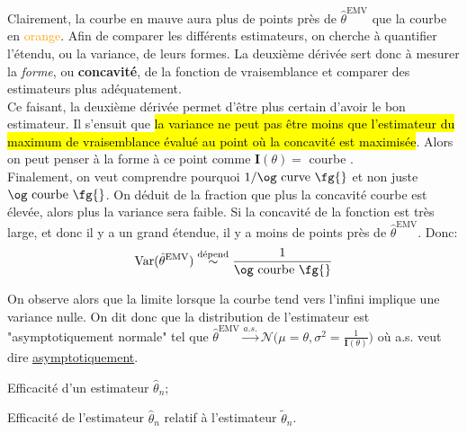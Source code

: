 \documentclass[10pt, french]{article}
\begin{document}
\begin{multicols*}{2}

Clairement, la courbe \textcolor{amethyst}{en mauve} aura plus de points près de $\hat{\theta}^{\text{EMV}}$ que la courbe en \textcolor{orange}{orange}. Afin de comparer les différents estimateurs, on cherche à quantifier l'étendu, ou la variance, de leurs formes. 
La deuxième dérivée sert donc à mesurer la \textit{forme}, ou \textbf{concavité}, de la fonction de vraisemblance et comparer des estimateurs plus adéquatement. \\

Ce faisant, la deuxième dérivée permet d'être plus certain d'avoir le bon estimateur. Il s'ensuit que \hl{la variance ne peut pas être moins que l'estimateur du maximum de vraisemblance évalué au point où la concavité est maximisée}. Alors on peut penser à la forme à ce point comme $\bm{I}(\theta) =$ \og courbe \fg{}. \\

Finalement, on veut comprendre pourquoi $1/\text{\og curve \fg{}}$ et non juste $\text{\og courbe \fg{}}$. On déduit de la fraction que plus la concavité \og courbe \fg{} est élevée, alors plus la variance sera faible. Si la concavité de la fonction est très large, et donc il y a un grand étendue, il y a moins de points près de $\hat\theta^{\text{EMV}}$. Donc:
\begin{equation*}
	\text{Var}(\hat\theta^{\text{EMV}}) 
	\overset{\text{dépend}}{\sim} \frac{1}{\text{\og courbe \fg{}}}	\\
\end{equation*}

On observe alors que la limite lorsque la \og courbe \fg{} tend vers l'infini implique une variance nulle. On dit donc que la distribution de l'estimateur est "asymptotiquement normale" tel que $\hat\theta^{\text{EMV}} \overset{a.s.}{\rightarrow} \mathcal{N}\Big(\mu = \theta, \sigma^{2} = \frac{1}{\bm{I}(\theta)}\Big)$ où a.s. veut dire \hyperlink{asympto}{asymptotiquement}.

\columnbreak

\begin{distributions}[Notation]
\begin{description}[font = \normalfont]
	\item[$\text{eff}(\hat{\theta}_{n})$]	Efficacité d'un estimateur $\hat{\theta}_{n}$;
	\item[$\text{eff}(\hat\theta_{n}, \tilde\theta_{n})$]	Efficacité de l'estimateur $\hat{\theta}_{n}$ relatif à l'estimateur $\tilde{\theta}_{n}$.
\end{description}
\end{distributions}


\end{multicols*}
\end{document}
